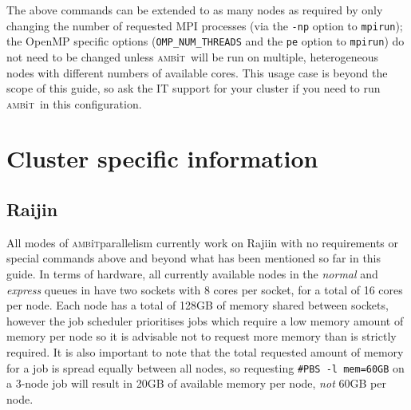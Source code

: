 \documentclass{report}
\newcommand{\ambit}{\textsc{amb}{\footnotesize i}\textsc{t}}
\begin{document}

The above commands can be extended to as many nodes as required by only changing the number of
requested MPI processes (via the \texttt{-np} option to \texttt{mpirun}); the OpenMP specific options
(\texttt{OMP\_NUM\_THREADS} and the \texttt{pe} option to \texttt{mpirun}) do not need to be changed
unless \ambit ~will be run on multiple, heterogeneous nodes with different numbers of available cores.
This usage case is beyond the scope of this guide, so ask the IT support for your cluster if you need to 
run \ambit ~in this configuration.

\section{Cluster specific information}
\label{sec:cluster_specific}
\subsection{Raijin}
All modes of \ambit parallelism currently work on Rajiin with no requirements or special commands above 
and beyond what has been mentioned so far in this guide. In terms of hardware, all currently available 
nodes in the \textit{normal} and \textit{express} queues in have two sockets with 8 cores per socket, 
for a total of 16 cores per node. Each node has a total of 128GB of memory shared between sockets,
however the job scheduler prioritises jobs which require a low memory amount of memory per node so it is 
advisable not to request more memory than is strictly required. It is also important to note that the
total requested amount of memory for a job is spread equally between all nodes, so requesting
\texttt{\#PBS -l mem=60GB} on a 3-node job will result in 20GB of available memory per node, \emph{not}
60GB per node.
\end{document}
